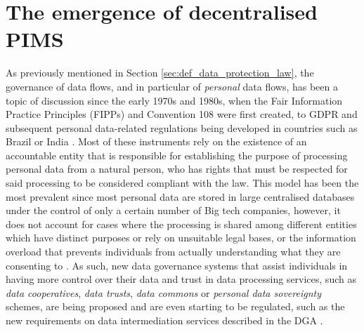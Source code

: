 \section{The emergence of decentralised PIMS}
\label{sec:motivation_legal}

As previously mentioned in Section \ref{sec:def_data_protection_law}, the governance of data flows, and in particular of \textit{personal} data flows, has been a topic of discussion since the early 1970s and 1980s, when the Fair Information Practice Principles (FIPPs) \citep{cate_failure_2006} and Convention 108 \citep{council_of_europe_convention_1981} were first created, to GDPR and subsequent personal data-related regulations being developed in countries such as Brazil or India \citep{bradford_brussels_2019}.
Most of these instruments rely on the existence of an accountable entity that is responsible for establishing the purpose of processing personal data from a natural person, who has rights that must be respected for said processing to be considered compliant with the law.
This model has been the most prevalent since most personal data are stored in large centralised databases under the control of only a certain number of Big tech companies, however, it does not account for cases where the processing is shared among different entities which have distinct purposes or rely on unsuitable legal bases, or the information overload that prevents individuals from actually understanding what they are consenting to \citep{benshahar_more_2014}.
As such, new data governance systems that assist individuals in having more control over their data and trust in data processing services, such as \textit{data cooperatives}, \textit{data trusts}, \textit{data commons} or \textit{personal data sovereignty} schemes, are being proposed \citep{viljoen_relational_2021,craglia_digitranscope_2021} and are even starting to be regulated, such as the new requirements on data intermediation services described in the DGA \citeyearpar{noauthor_regulation_2022}.

